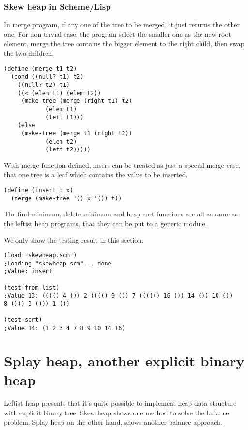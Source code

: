 \documentclass{article}
\begin{document}
\subsubsection*{Skew heap in Scheme/Lisp}

In merge program, if any one of the tree to be merged, it just returns the
other one. For non-trivial case, the program select the smaller one
as the new root element, merge the tree contains the bigger element
to the right child, then swap the two children.

\lstset{language = lisp}
\begin{lstlisting}
(define (merge t1 t2)
  (cond ((null? t1) t2)
	((null? t2) t1)
	((< (elem t1) (elem t2)) 
	 (make-tree (merge (right t1) t2) 
		    (elem t1)
		    (left t1)))
	(else 
	 (make-tree (merge t1 (right t2))
		    (elem t2)
		    (left t2)))))
\end{lstlisting}

With merge function defined, insert can be treated as just a special
merge case, that one tree is a leaf which contains the value to be
inserted.

\begin{lstlisting}
(define (insert t x)
  (merge (make-tree '() x '()) t))
\end{lstlisting}

The find minimum, delete minimum and heap sort functions are all
as same as the leftist heap programs, that they can be put to 
a generic module. 

We only show the testing result in this section.

\begin{lstlisting}
(load "skewheap.scm")
;Loading "skewheap.scm"... done
;Value: insert

(test-from-list)
;Value 13: (((() 4 ()) 2 (((() 9 ()) 7 ((((() 16 ()) 14 ()) 10 ()) 
8 ())) 3 ())) 1 ())

(test-sort)
;Value 14: (1 2 3 4 7 8 9 10 14 16)
\end{lstlisting}


\section{Splay heap, another explicit binary heap}
\label{splayheap}

Leftist heap presents that it's quite possible to implement
heap data structure with explicit binary tree. Skew heap
shows one method to solve the balance problem. Splay heap
on the other hand, shows another balance approach.
\end{document}
